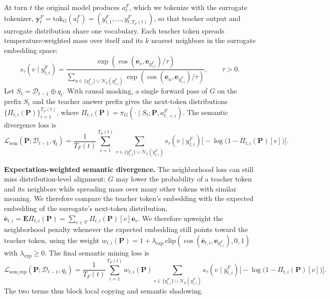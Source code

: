 At turn $t$ the original model produces $a_t^F$, which we tokenize with the surrogate tokenizer, $\boldsymbol y_t^F=\mathrm{tok}_G(a_t^F)=(y_{t,1}^F,\ldots,y_{t,T_F(t)}^F)$, so that teacher output and surrogate distribution share one vocabulary. Each teacher token spreads temperature-weighted mass over itself and its $k$ nearest neighbors in the surrogate embedding space:
\[
s_{\tau}(v\mid y_{t,i}^F)=
\frac{\exp(\cos(\boldsymbol e_v,\boldsymbol e_{y_{t,i}^F})/\tau)}
{\sum_{u\in\{y_{t,i}^F\}\cup\mathcal N_k(y_{t,i}^F)}
\exp(\cos(\boldsymbol e_u,\boldsymbol e_{y_{t,i}^F})/\tau)},
\qquad \tau>0 .
\]
Let $S_t=\mathcal D_{t-1}\oplus q_t$. With causal masking, a single forward pass of $G$ on the prefix $S_t$ and the teacher answer prefix gives the next-token distributions
$\{\Pi_{t,i}(\mathbf P)\}_{i=1}^{T_F(t)}$, where
$\Pi_{t,i}(\mathbf P)=\pi_G(\cdot\mid S_t;\mathbf P, a_{t,<i}^F)$.
The semantic divergence loss is
\begin{equation}
\label{eq:sem-with-aF}
\mathcal L_{\mathrm{sem}}(\mathbf P;\mathcal D_{t-1},q_t)=
\frac{1}{T_F(t)}\sum_{i=1}^{T_F(t)}
\sum_{v\in\{y_{t,i}^F\}\cup\mathcal N_k(y_{t,i}^F)}
s_{\tau}(v\mid y_{t,i}^F)
\Big[-\log\big(1-\Pi_{t,i}(\mathbf P)[v]\big)\Big].
\end{equation}

\textbf{Expectation-weighted semantic divergence.}
The neighborhood loss can still miss distribution-level alignment: $G$ may lower the probability of a teacher token and its neighbors while spreading mass over many other tokens with similar meaning. We therefore compare the teacher token's embedding with the expected embedding of the surrogate's next-token distribution, $\bar{\boldsymbol e}_{t,i}=\mathbf E\Pi_{t,i}(\mathbf P)
=\sum_{v\in\mathcal V}\Pi_{t,i}(\mathbf P)[v] \boldsymbol e_v $. We therefore upweight the neighborhood penalty whenever the expected embedding still points toward the teacher token, using the weight $w_{t,i}(\mathbf P)=1+\lambda_{\mathrm{exp}}\,
\mathrm{clip}\!\left(
\cos(\bar{\boldsymbol e}_{t,i},\boldsymbol e_{y_{t,i}^{F}}),0,1
\right)$ with $\lambda_{\mathrm{exp}}\ge 0$. The final semantic mining loss is
\begin{equation}
\label{eq:semexp-with-aF}
\mathcal L_{\mathrm{sem\_exp}}(\mathbf P;\mathcal D_{t-1},q_t)=
\frac{1}{T_F(t)}\sum_{i=1}^{T_F(t)}
w_{t,i}(\mathbf P)
\sum_{v\in\{y_{t,i}^F\}\cup\mathcal N_k(y_{t,i}^F)}
s_{\tau}(v\mid y_{t,i}^{F})
\Big[-\log\big(1-\Pi_{t,i}(\mathbf P)[v]\big)\Big].
\end{equation}
The two terms thus block local copying and semantic shadowing.

